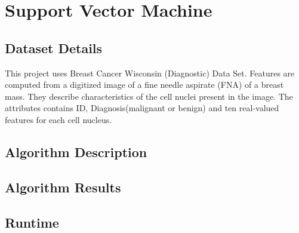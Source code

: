 \documentclass{article}
\begin{document}

\section{Support Vector Machine}
\subsection{Dataset Details}
This project uses Breast Cancer Wisconsin (Diagnostic) Data Set. Features are computed from a digitized image of a fine needle aspirate (FNA) of a breast mass. They describe characteristics of the cell nuclei present in the image. 
The attributes contains ID, Diagnosis(malignant or benign) and ten real-valued features for each cell nucleus.
\subsection{Algorithm Description}
\subsection{Algorithm Results}
\subsection{Runtime}












%

%

\end{document}

